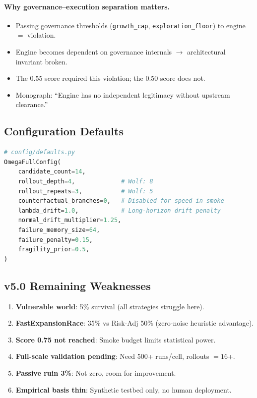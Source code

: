 \paragraph{Why governance--execution separation matters.}

\begin{itemize}
\item Passing governance thresholds (\texttt{growth\_cap},
\texttt{exploration\_floor}) to engine $=$ violation.
\item Engine becomes dependent on governance internals $\to$
architectural invariant broken.
\item The 0.55 score required this violation; the 0.50 score does
not.
\item Monograph: ``Engine has no independent legitimacy without
upstream clearance.''
\end{itemize}

\subsection{Configuration Defaults}
\label{sec:methodology-v50-config}

\begin{lstlisting}[language=Python,basicstyle=\ttfamily\small,frame=single]
# config/defaults.py
OmegaFullConfig(
    candidate_count=14,
    rollout_depth=4,             # Wolf: 8
    rollout_repeats=3,           # Wolf: 5
    counterfactual_branches=0,   # Disabled for speed in smoke
    lambda_drift=1.0,            # Long-horizon drift penalty
    normal_drift_multiplier=1.25,
    failure_memory_size=64,
    failure_penalty=0.15,
    fragility_prior=0.5,
)
\end{lstlisting}

\subsection{v5.0 Remaining Weaknesses}
\label{sec:methodology-v50-weaknesses}

\begin{enumerate}
\item \textbf{Vulnerable world}: 5\% survival (all strategies
struggle here).
\item \textbf{FastExpansionRace}: 35\% vs Risk-Adj 50\% (zero-noise
heuristic advantage).
\item \textbf{Score 0.75 not reached}: Smoke budget limits
statistical power.
\item \textbf{Full-scale validation pending}: Need 500+ runs/cell,
rollouts $= 16$+.
\item \textbf{Passive ruin 3\%}: Not zero, room for improvement.
\item \textbf{Empirical basis thin}: Synthetic testbed only, no
human deployment.
\end{enumerate}


